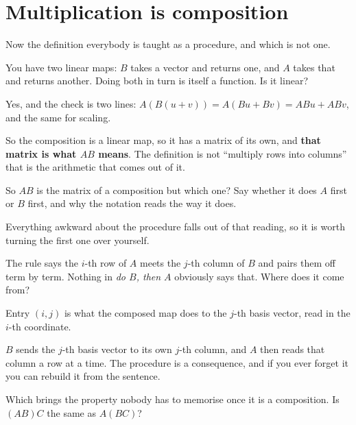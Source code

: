 \section{Multiplication is composition}
\label{sec:P06-composition}

\begin{fr}
Now the definition everybody is taught as a procedure, and which is not one.

You have two linear maps: $B$ takes a vector and returns one, and $A$ takes
that and returns another. Doing both in turn is itself a function. Is it
linear?
\nextframe
\end{fr}

\begin{fr}
\begin{ansblock}
Yes, and the check is two lines: $A(B(u+v)) = A(Bu + Bv) = ABu + ABv$, and the
same for scaling.
\end{ansblock}

So the composition is a linear map, so it has a matrix of its own, and
\textbf{that matrix is what $AB$ means}. The definition is not
\enquote{multiply rows into columns} \dash{} that is the arithmetic that comes
out of it.

So $AB$ is the matrix of a composition \dash{} but which one? Say whether it
does $A$ first or $B$ first, and why the notation reads the way it does.
\dotline
\nextframe
\end{fr}

\begin{fr}
Everything awkward about the procedure falls out of that reading, so it is
worth turning the first one over yourself.

The rule says the $i$-th row of $A$ meets the $j$-th column of $B$ and pairs
them off term by term. Nothing in \emph{do $B$, then $A$} obviously says that.
Where does it come from?
\dotline
\nextframe
\end{fr}

\begin{fr}
\begin{ansblock}
Entry $(i, j)$ is what the composed map does to the $j$-th basis vector, read
in the $i$-th coordinate.
\end{ansblock}

$B$ sends the $j$-th basis vector to its own $j$-th column, and $A$ then reads
that column a row at a time. The procedure is a consequence, and if you ever
forget it you can rebuild it from the sentence.

Which brings the property nobody has to memorise once it is a composition. Is
$(AB)C$ the same as $A(BC)$?
\nextframe
\end{fr}

